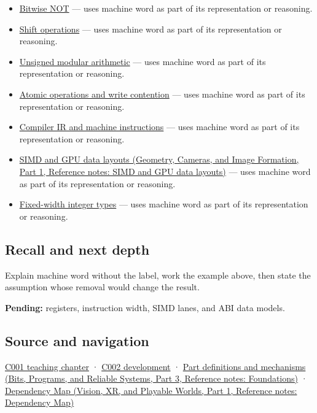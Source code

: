 \begin{itemize}
\tightlist
\item
  \hyperref[appendix-8f38927cfc54]{Bitwise NOT} --- uses machine word as part of its representation or reasoning.
\item
  \hyperref[appendix-73425b25118e]{Shift operations} --- uses machine word as part of its representation or reasoning.
\item
  \hyperref[appendix-c99977d88b33]{Unsigned modular arithmetic} --- uses machine word as part of its representation or reasoning.
\item
  \hyperref[appendix-e12d1b03fefb]{Atomic operations and write contention} --- uses machine word as part of its representation or reasoning.
\item
  \hyperref[appendix-942ad41afb30]{Compiler IR and machine instructions} --- uses machine word as part of its representation or reasoning.
\item
  \href{../03-Geometry-Cameras-and-Image-Formation-P01/main.pdf\#nameddest=appendix-3c7b1a56de01}{SIMD and GPU data layouts (Geometry, Cameras, and Image Formation, Part 1, Reference notes: SIMD and GPU data layouts)} --- uses machine word as part of its representation or reasoning.
\item
  \hyperref[appendix-cc04044b5782]{Fixed-width integer types} --- uses machine word as part of its representation or reasoning.
\end{itemize}

\subsection{Recall and next depth}\label{appendix-d67a19507dc5-recall-and-next-depth}

\hypertarget{appendix-d67a19507dc5-recall-and-next-depth}{}

Explain machine word without the label, work the example above, then state the assumption whose removal would change the result.

\textbf{Pending:} registers, instruction width, SIMD lanes, and ABI data models.

\subsection{Source and navigation}\label{appendix-d67a19507dc5-source-and-navigation}

\hypertarget{appendix-d67a19507dc5-source-and-navigation}{}

\hyperref[01-foundations-i-ch001-from-a-signal-to-an-interpretation]{C001 teaching chapter} · \hyperref[01-foundations-i-ch001-arithmetic-becomes-a-policy]{C002 development} · \href{../01-Bits-Programs-and-Reliable-Systems-P03/main.pdf\#nameddest=appendix-fd090d982a15}{Part definitions and mechanisms (Bits, Programs, and Reliable Systems, Part 3, Reference notes: Foundations)} · \href{../07-Vision-XR-and-Playable-Worlds-P01/main.pdf\#nameddest=appendix-4ad47bdd269a}{Dependency Map (Vision, XR, and Playable Worlds, Part 1, Reference notes: Dependency Map)}
